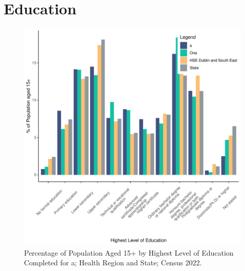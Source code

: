 \documentclass{article}
\begin{document}
\section{Education}\label{sect:Edu}
\begin{figure}[H]
	\centering
	\includegraphics[width = 120mm]{../figures/EduED.pdf}
	\caption{Percentage of Population Aged 15+ by Highest Level of Education Completed for a; Health Region and State; Census 2022.}
	\label{fig:vbnv}
	\end{figure}
\end{document}
